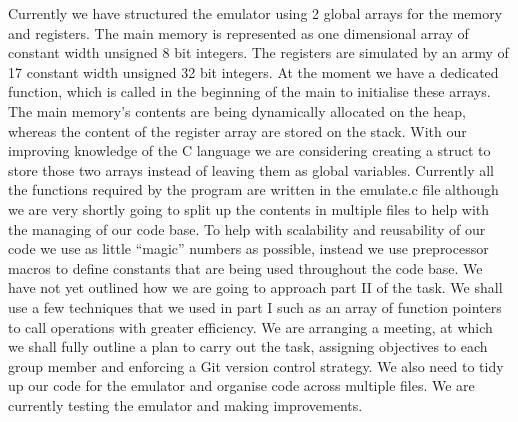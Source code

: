 \documentclass[11pt]{article}
\begin{document}
Currently we have structured the emulator using 2 global arrays for the memory and registers. The main memory is represented as one dimensional array of constant width unsigned 8 bit integers. The registers are simulated by an army of 17 constant width unsigned 32 bit integers. At the moment we have a dedicated function, which is called in the beginning of the main to initialise these arrays. The main memory’s contents are being dynamically allocated on the heap, whereas the content of the register array are stored on the stack. With our improving knowledge of the C language we are considering creating a struct to store those two arrays instead of leaving them as global variables. Currently all the functions required by the program are written in the emulate.c file although we are very shortly going to split up the contents in multiple files to help with the managing of our code base. To help with scalability and reusability of our code we use as little “magic” numbers as possible, instead we use preprocessor macros to define constants that are being used throughout the code base. 
We have not yet outlined how we are going to approach part II of the task. We shall use a few techniques that we used in part I such as an array of function pointers to call operations with greater efficiency. We are arranging a meeting, at which we shall fully outline a plan to carry out the task, assigning objectives to each group member and enforcing a Git version control strategy. We also need to tidy up our code for the emulator and organise code across multiple files. We are currently testing the emulator and making improvements.
\end{document}
